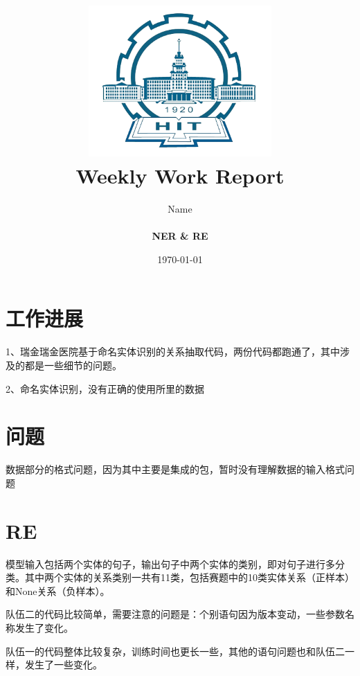 \documentclass[a4paper]{article}
\title{
    \vspace*{1in}
    \includegraphics[width=2.75in]{figures/zhenglab-logo} \\
    \vspace*{1.2in}
    \textbf{\huge Weekly Work Report}
    \vspace{0.2in}
}
\author{Name \\
    \vspace*{0.5in} \\
    \textbf{NER \& RE} \\
    \vspace*{1in}
}
\date{\today}
\begin{document}
\maketitle
\setcounter{page}{0}
\thispagestyle{empty}
\newpage


\section{工作进展}

1、瑞金瑞金医院基于命名实体识别的关系抽取代码，两份代码都跑通了，其中涉及的都是一些细节的问题。

2、命名实体识别，没有正确的使用所里的数据

\section{问题}

数据部分的格式问题，因为其中主要是集成的包，暂时没有理解数据的输入格式问题


\section{RE}

模型输入包括两个实体的句子，输出句子中两个实体的类别，即对句子进行多分类。其中两个实体的关系类别一共有11类，包括赛题中的10类实体关系（正样本）和None关系（负样本）。

队伍二的代码比较简单，需要注意的问题是：个别语句因为版本变动，一些参数名称发生了变化。

队伍一的代码整体比较复杂，训练时间也更长一些，其他的语句问题也和队伍二一样，发生了一些变化。


%
%
%
\end{document}
